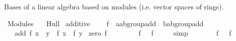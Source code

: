 %
\begin{isabellebody}%
%
%
\isadelimdocument
%
\endisadelimdocument
%
\isatagdocument
%
\isamarkuptrue%
%
\endisatagdocument
{\isafolddocument}%
%
\isadelimdocument
%
\endisadelimdocument
%
\begin{isamarkuptext}%
Bases of a linear algebra based on modules (i.e. vector spaces of rings).%
\end{isamarkuptext}\isamarkuptrue%
%
\isadelimtheory
%
\endisadelimtheory
%
\isatagtheory
{}\isamarkupfalse%
\ Modules\isanewline
\ \ \ Hull\isanewline
{}%
\endisatagtheory
{\isafoldtheory}%
%
\isadelimtheory
%
\endisadelimtheory
%
\isadelimdocument
%
\endisadelimdocument
%
\isatagdocument
%
\isamarkuptrue%
%
\endisatagdocument
{\isafolddocument}%
%
\isadelimdocument
%
\endisadelimdocument
{}\isamarkupfalse%
\ additive\ {\isacharequal}{\kern0pt}\isanewline
\ \ \ f\ {\isacharcolon}{\kern0pt}{\isacharcolon}{\kern0pt}\ {\isachardoublequoteopen}{\isacharprime}{\kern0pt}a{\isacharcolon}{\kern0pt}{\isacharcolon}{\kern0pt}ab{\isacharunderscore}{\kern0pt}group{\isacharunderscore}{\kern0pt}add\ {\isasymRightarrow}\ {\isacharprime}{\kern0pt}b{\isacharcolon}{\kern0pt}{\isacharcolon}{\kern0pt}ab{\isacharunderscore}{\kern0pt}group{\isacharunderscore}{\kern0pt}add{\isachardoublequoteclose}\isanewline
\ \ \ add{\isacharcolon}{\kern0pt}\ {\isachardoublequoteopen}f\ {\isacharparenleft}{\kern0pt}x\ {\isacharplus}{\kern0pt}\ y{\isacharparenright}{\kern0pt}\ {\isacharequal}{\kern0pt}\ f\ x\ {\isacharplus}{\kern0pt}\ f\ y{\isachardoublequoteclose}\isanewline
{}\isanewline
\isanewline
{}\isamarkupfalse%
\ zero{\isacharcolon}{\kern0pt}\ {\isachardoublequoteopen}f\ {}\ {\isacharequal}{\kern0pt}\ {}{\isachardoublequoteclose}\isanewline
%
\isadelimproof
%
\endisadelimproof
%
\isatagproof
{}\isamarkupfalse%
\ {\isacharminus}{\kern0pt}\isanewline
\ \ \isamarkupfalse%
\ {\isachardoublequoteopen}f\ {}\ {\isacharequal}{\kern0pt}\ f\ {\isacharparenleft}{\kern0pt}{}\ {\isacharplus}{\kern0pt}\ {}{\isacharparenright}{\kern0pt}{\isachardoublequoteclose}\ \isamarkupfalse%
\ simp\isanewline
\ \ \isamarkupfalse%
\ \isamarkupfalse%
\ {\isachardoublequoteopen}{\isasymdots}\ {\isacharequal}{\kern0pt}\ f\ {}\ {\isacharplus}{\kern0pt}\ f\ {}{\isachardoublequoteclose}\ \isamarkupfalse%

\end{isabellebody}
